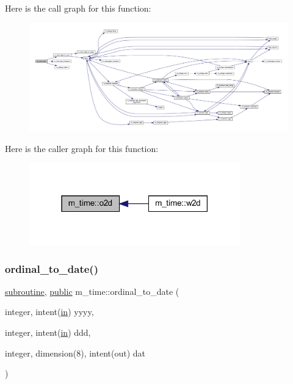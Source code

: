 \begin{DoxyVerb}
Here is the call graph for this function\+:
\nopagebreak
\begin{figure}[H]
\begin{center}
\leavevmode
\includegraphics[width=350pt]{namespacem__time_a55e2cb9efc9d4d209ae2864f073d4f19_cgraph}
\end{center}
\end{figure}
Here is the caller graph for this function\+:
\nopagebreak
\begin{figure}[H]
\begin{center}
\leavevmode
\includegraphics[width=259pt]{namespacem__time_a55e2cb9efc9d4d209ae2864f073d4f19_icgraph}
\end{center}
\end{figure}
\mbox{\label{namespacem__time_aa4dca4409bf20a011bb04988c1335d63}} 
\subsubsection{\texorpdfstring{ordinal\+\_\+to\+\_\+date()}{ordinal\_to\_date()}}
{\footnotesize\ttfamily \hyperlink{M__stopwatch_83_8txt_acfbcff50169d691ff02d4a123ed70482}{subroutine}, \hyperlink{M__stopwatch_83_8txt_a2f74811300c361e53b430611a7d1769f}{public} m\+\_\+time\+::ordinal\+\_\+to\+\_\+date (\begin{DoxyParamCaption}\item[{integer, intent(\hyperlink{M__journal_83_8txt_afce72651d1eed785a2132bee863b2f38}{in})}]{yyyy,  }\item[{integer, intent(\hyperlink{M__journal_83_8txt_afce72651d1eed785a2132bee863b2f38}{in})}]{ddd,  }\item[{integer, dimension(8), intent(out)}]{dat }\end{DoxyParamCaption})}




\end{DoxyVerb}
